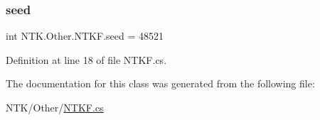 \subsubsection{\texorpdfstring{seed}{seed}}
{\footnotesize\ttfamily int N\+T\+K.\+Other.\+N\+T\+K\+F.\+seed = 48521\hspace{0.3cm}{\ttfamily [static]}}



Definition at line 18 of file N\+T\+K\+F.\+cs.



The documentation for this class was generated from the following file\+:\begin{DoxyCompactItemize}
\item 
N\+T\+K/\+Other/\mbox{\hyperlink{_n_t_k_f_8cs}{N\+T\+K\+F.\+cs}}\end{DoxyCompactItemize}

